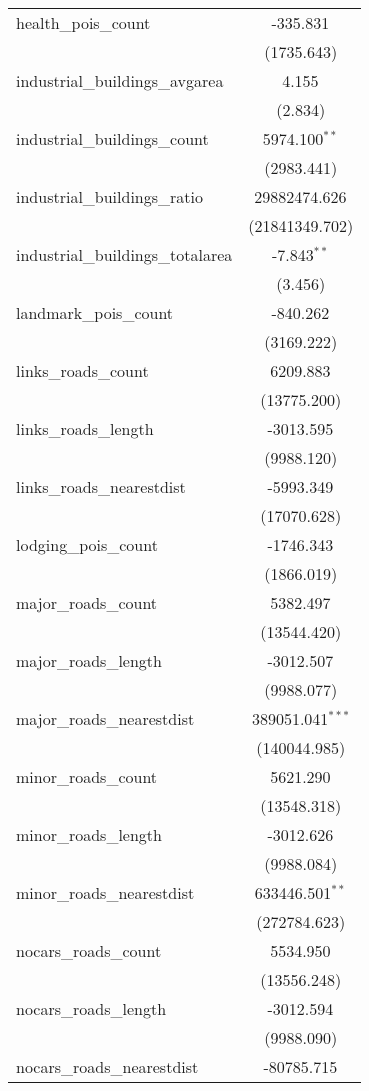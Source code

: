 \begin{table}[!htbp]
\begin{tabular}{@{\extracolsep{5pt}}lc}
 health_pois_count & -335.831$^{}$ \\
  & (1735.643) \\
 industrial_buildings_avgarea & 4.155$^{}$ \\
  & (2.834) \\
 industrial_buildings_count & 5974.100$^{**}$ \\
  & (2983.441) \\
 industrial_buildings_ratio & 29882474.626$^{}$ \\
  & (21841349.702) \\
 industrial_buildings_totalarea & -7.843$^{**}$ \\
  & (3.456) \\
 landmark_pois_count & -840.262$^{}$ \\
  & (3169.222) \\
 links_roads_count & 6209.883$^{}$ \\
  & (13775.200) \\
 links_roads_length & -3013.595$^{}$ \\
  & (9988.120) \\
 links_roads_nearestdist & -5993.349$^{}$ \\
  & (17070.628) \\
 lodging_pois_count & -1746.343$^{}$ \\
  & (1866.019) \\
 major_roads_count & 5382.497$^{}$ \\
  & (13544.420) \\
 major_roads_length & -3012.507$^{}$ \\
  & (9988.077) \\
 major_roads_nearestdist & 389051.041$^{***}$ \\
  & (140044.985) \\
 minor_roads_count & 5621.290$^{}$ \\
  & (13548.318) \\
 minor_roads_length & -3012.626$^{}$ \\
  & (9988.084) \\
 minor_roads_nearestdist & 633446.501$^{**}$ \\
  & (272784.623) \\
 nocars_roads_count & 5534.950$^{}$ \\
  & (13556.248) \\
 nocars_roads_length & -3012.594$^{}$ \\
  & (9988.090) \\
 nocars_roads_nearestdist & -80785.715$^{}$ \\

\end{tabular}
\end{table}
